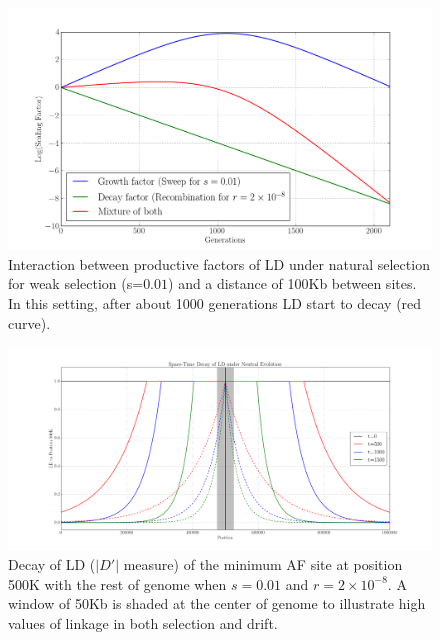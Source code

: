 \documentclass[11pt]{article}
\begin{document}
\begin{figure}[H]
	\centering
	\includegraphics[width=\textwidth]{figures/decayFactors}
	\caption{Interaction between productive factors of LD under natural 
		selection for weak selection (s=$0.01$) and a distance of 100Kb between 
		sites. In this setting, after about 1000 generations LD start to decay 
		(red 
		curve).} \label{fig:ldf}
\end{figure}


\begin{figure}[H]
	\centering
	\includegraphics[width=\textwidth]{figures/LDDecay2d}
	\caption{Decay of LD ($|D'|$ measure) of the minimum AF site at position 
		500K with the rest of genome when $s=0.01$ and $r=2\times10^{-8}$. A 
		window 
		of 50Kb is shaded at the center of genome to illustrate high values of 
		linkage in both selection and drift.} \label{fig:ld2d}
\end{figure}
\end{document}
